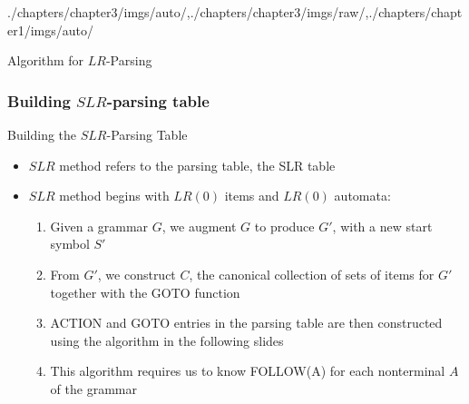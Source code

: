 \begin{graphicspathcontext}{{./chapters/chapter3/imgs/auto/},{./chapters/chapter3/imgs/raw/},{./chapters/chapter1/imgs/auto/}}
\begin{bibunit}[apalike]
\begin{frame}[t]{Algorithm for $LR$-Parsing}
	\begin{scriptsize}
	\vspace{-.23cm}
	\begin{myalgorithm}
	\BlankLine
	\end{myalgorithm}
	\end{scriptsize}
\end{frame}

\subsubsection{Building $SLR$-parsing table}
\subsubsectiontableofcontentslide

\begin{frame}[background={10}]{Building the $SLR$-Parsing Table}
	\begin{itemize}
	\item $SLR$ method refers to the parsing table, the SLR table
	\vfill
	\item $SLR$ method begins with $LR(0)$ items and $LR(0)$ automata:
		\begin{enumerate}
		\item Given a grammar $G$, we augment $G$ to produce $G'$, with a new start symbol $S'$
		\item From $G'$, we construct $C$, the canonical collection of sets of items for $G'$ together with the GOTO function
		\item ACTION and GOTO entries in the parsing table are then constructed using the algorithm in the following slides
		\item This algorithm requires us to know FOLLOW(A) for each nonterminal $A$ of the grammar
		\end{enumerate}
	\end{itemize}
\end{frame}


\end{bibunit}
\end{graphicspathcontext}
